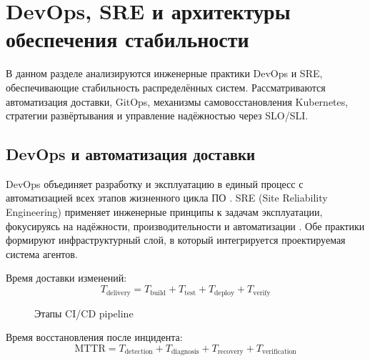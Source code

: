 \chapter{DevOps, SRE и архитектуры обеспечения стабильности}\label{ch:devops}

В данном разделе анализируются инженерные практики DevOps и SRE, обеспечивающие стабильность распределённых систем. Рассматриваются автоматизация доставки, GitOps, механизмы самовосстановления Kubernetes, стратегии развёртывания и управление надёжностью через SLO/SLI.

\section{DevOps и автоматизация доставки}

DevOps объединяет разработку и эксплуатацию в единый процесс с автоматизацией всех этапов жизненного цикла ПО \cite{kim_devops_handbook,devops_culture}. SRE (Site Reliability Engineering) применяет инженерные принципы к задачам эксплуатации, фокусируясь на надёжности, производительности и автоматизации \cite{google_sre_book,sre_principles,russian_sre}. Обе практики формируют инфраструктурный слой, в который интегрируется проектируемая система агентов.

Время доставки изменений:
\begin{equation}
T_{\text{delivery}} = T_{\text{build}} + T_{\text{test}} + T_{\text{deploy}} + T_{\text{verify}}
\label{eq:delivery_time}
\end{equation}

\begin{figure}[H]
\centering
{}
\caption{Этапы CI/CD pipeline}
\label{fig:cicd_pipeline}
\end{figure}

Время восстановления после инцидента:
\begin{equation}
\text{MTTR} = T_{\text{detection}} + T_{\text{diagnosis}} + T_{\text{recovery}} + T_{\text{verification}}
\label{eq:mttr_components}
\end{equation}

